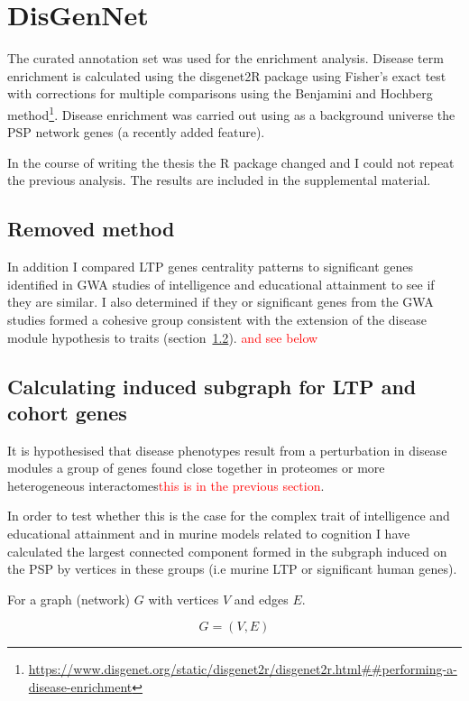 \section{DisGenNet}

The curated annotation set was used for the enrichment analysis. Disease term enrichment is calculated using the disgenet2R package using Fisher's exact test with corrections for multiple comparisons using the Benjamini and Hochberg method\footnote{\url{https://www.disgenet.org/static/disgenet2r/disgenet2r.html##performing-a-disease-enrichment}}. Disease enrichment was carried out using as a background universe the PSP network genes (a recently added feature). 

 In the course of writing the thesis the R package changed and I could not repeat the previous analysis. The results are included in the supplemental material. 
 
 \subsection{Removed method}
 In addition I compared LTP genes centrality patterns to significant genes identified in GWA studies of intelligence and educational attainment to see if they are similar. I also determined if they or significant genes from the GWA studies formed a cohesive group consistent with the extension of the disease module hypothesis to traits (section~\ref{sec:method_induced_subgraph}). \textcolor{red}{and see below}
 
 
\subsection{Calculating induced subgraph for LTP and cohort genes}
\label{sec:method_induced_subgraph}
It is hypothesised that disease phenotypes result from a perturbation in disease modules a group of genes found close together in proteomes or more heterogeneous interactomes\cite{barabasi2011network}\textcolor{red}{this is in the previous section}. 

In order to test whether this is the case for the complex trait of intelligence and educational attainment and in murine models related to cognition I have calculated the largest connected component formed in the subgraph induced on the PSP by vertices in these groups (i.e murine LTP or significant human genes).

For a graph (network) $G$ with vertices $V$ and edges $E$.

\begin{equation}
    G = (V,E)
\end{equation}

